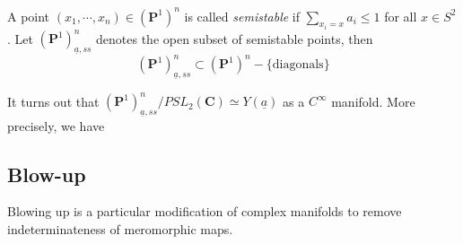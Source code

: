 \documentclass[
11pt, %
letterpaper， %
oneside, %
headinclude,footinclude, %
BCOR5mm, %
]{scrartcl}
\newcommand{\C}{{\mathbf{C}}}
\newcommand{\cp}{{\mathbf{P}}}
\begin{document}
\begin{definition}
	A point $(x_1,\cdots, x_n)\in (\cp^1)^n$ is called {\itshape semistable} if $\sum_{x_i=x} a_i \le 1$ for all $x\in S^2$. Let $(\cp^1 )^n_{\underline{a},ss}$ denotes the open subset of semistable points, then $$(\cp^1 )^n_{\underline{a},ss}\subset (\cp^1)^n-\{\text{diagonals}\}$$
\end{definition}
It turns out that $(\cp^1 )^n_{\underline{a},ss}/PSL_2(\C)\simeq Y(\underline{a})$ as a $C^{\infty}$ manifold. More precisely, we have 
\begin{center}
\end{center}
\subsection{Blow-up}
Blowing up is a particular modification of complex manifolds to remove indeterminateness of meromorphic maps.
\end{document}
